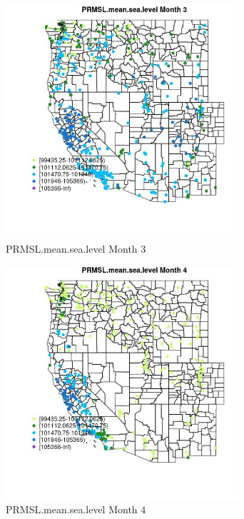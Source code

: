 \begin{figure} 
\centering  
\includegraphics[width=0.77\textwidth]{Code_Outputs/Report_ML_input_PM25_Step4_part_e_de_duplicated_aves_compiled_2019-05-18wNAs_MapObsMo3PRMSLmeansealevel.jpg} 
\caption{\label{fig:Report_ML_input_PM25_Step4_part_e_de_duplicated_aves_compiled_2019-05-18wNAsMapObsMo3PRMSLmeansealevel}PRMSL.mean.sea.level Month 3} 
\end{figure} 
 

\begin{figure} 
\centering  
\includegraphics[width=0.77\textwidth]{Code_Outputs/Report_ML_input_PM25_Step4_part_e_de_duplicated_aves_compiled_2019-05-18wNAs_MapObsMo4PRMSLmeansealevel.jpg} 
\caption{\label{fig:Report_ML_input_PM25_Step4_part_e_de_duplicated_aves_compiled_2019-05-18wNAsMapObsMo4PRMSLmeansealevel}PRMSL.mean.sea.level Month 4} 
\end{figure} 
 


